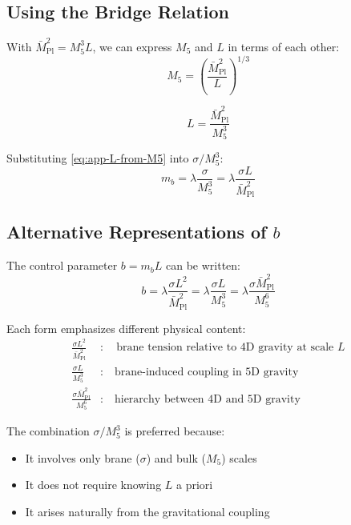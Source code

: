 \documentclass[11pt,a4paper]{article}
\newcommand{\Mpl}{\bar{M}_{\mathrm{Pl}}}
\newcommand{\Mfive}{M_5}
\newcommand{\mb}{m_b}
\theoremstyle{definition}
\theoremstyle{plain}
\theoremstyle{remark}
\begin{document}
\subsection{Using the Bridge Relation}

With $\Mpl^2 = \Mfive^3 L$, we can express $\Mfive$ and $L$ in terms of each other:
\begin{equation}
\Mfive = \left(\frac{\Mpl^2}{L}\right)^{1/3}
\label{eq:app-M5-from-L}
\end{equation}

\begin{equation}
L = \frac{\Mpl^2}{\Mfive^3}
\label{eq:app-L-from-M5}
\end{equation}

Substituting \cref{eq:app-L-from-M5} into $\sigma/\Mfive^3$:
\begin{equation}
\mb = \lambda \frac{\sigma}{\Mfive^3} = \lambda \frac{\sigma L}{\Mpl^2}
\label{eq:app-mb-alternate}
\end{equation}

\subsection{Alternative Representations of $b$}

The control parameter $b = \mb L$ can be written:
\begin{equation}
b = \lambda \frac{\sigma L^2}{\Mpl^2} = \lambda \frac{\sigma L}{\Mfive^3} = \lambda \frac{\sigma \Mpl^2}{\Mfive^6}
\label{eq:app-b-forms}
\end{equation}

Each form emphasizes different physical content:
\begin{align}
\frac{\sigma L^2}{\Mpl^2} &: \quad \text{brane tension relative to 4D gravity at scale } L \label{eq:app-b-interp1} \\
\frac{\sigma L}{\Mfive^3} &: \quad \text{brane-induced coupling in 5D gravity} \label{eq:app-b-interp2} \\
\frac{\sigma \Mpl^2}{\Mfive^6} &: \quad \text{hierarchy between 4D and 5D gravity} \label{eq:app-b-interp3}
\end{align}

The combination $\sigma/\Mfive^3$ is preferred because:
\begin{itemize}
\item It involves only brane ($\sigma$) and bulk ($\Mfive$) scales
\item It does not require knowing $L$ a priori
\item It arises naturally from the gravitational coupling
\end{itemize}
\end{document}
